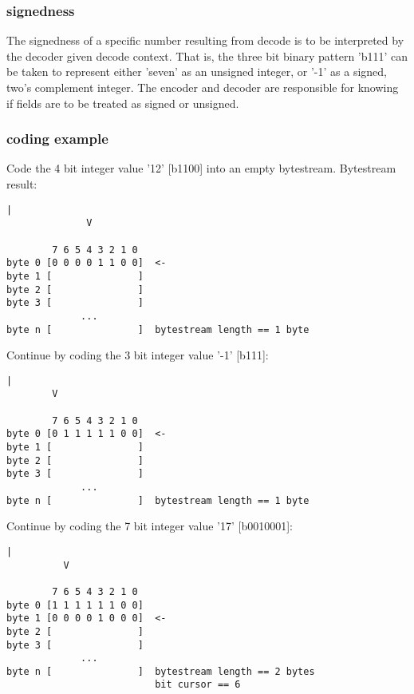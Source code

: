 \subsubsection{signedness}

The signedness of a specific number resulting from decode is to be
interpreted by the decoder given decode context.  That is, the three
bit binary pattern 'b111' can be taken to represent either 'seven' as
an unsigned integer, or '-1' as a signed, two's complement integer.
The encoder and decoder are responsible for knowing if fields are to
be treated as signed or unsigned.



\subsubsection{coding example}

Code the 4 bit integer value '12' [b1100] into an empty bytestream.
Bytestream result:

\begin{Verbatim}[commandchars=\\\{\}]
              |
              V

        7 6 5 4 3 2 1 0
byte 0 [0 0 0 0 1 1 0 0]  <-
byte 1 [               ]
byte 2 [               ]
byte 3 [               ]
             ...
byte n [               ]  bytestream length == 1 byte

\end{Verbatim}


Continue by coding the 3 bit integer value '-1' [b111]:

\begin{Verbatim}[commandchars=\\\{\}]
        |
        V

        7 6 5 4 3 2 1 0
byte 0 [0 1 1 1 1 1 0 0]  <-
byte 1 [               ]
byte 2 [               ]
byte 3 [               ]
             ...
byte n [               ]  bytestream length == 1 byte
\end{Verbatim}


Continue by coding the 7 bit integer value '17' [b0010001]:

\begin{Verbatim}[commandchars=\\\{\}]
          |
          V

        7 6 5 4 3 2 1 0
byte 0 [1 1 1 1 1 1 0 0]
byte 1 [0 0 0 0 1 0 0 0]  <-
byte 2 [               ]
byte 3 [               ]
             ...
byte n [               ]  bytestream length == 2 bytes
                          bit cursor == 6
\end{Verbatim}


